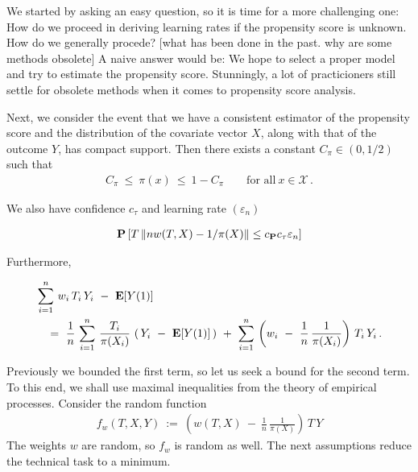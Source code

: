 We started by asking an easy question, so it is time for a more challenging one: How do we proceed in deriving learning rates if the propensity score is unknown.
How do we generally procede?
[what has been done in the past. why are some methods obsolete]
A naive answer would be: We hope to select a proper model and try to estimate the propensity score.
Stunningly, a lot of practicioners still settle for obsolete methods when it comes to propensity score analysis.


Next, we consider the event that we have a consistent estimator of the 
propensity score and the distribution of the covariate vector $X$, 
along with that of the outcome $Y$, 
has compact support.
Then there exists a constant $C_\pi\in (0,1/2)$ such that 
\begin{gather}
  C_\pi \ \le\  \pi(x) \ \le\  1-C_\pi 
  \qquad
  \text{for all}\ 
  x \in \mathcal{X}\,.
\end{gather}

We also have
confidence $c_\tau$ and learning rate $(\varepsilon_n)$

\begin{gather}
  \mathbf{P}
  \left[ 
    T
    \left\lVert
      n w(T,X)
      -
      1/\pi(X)
    \right\rVert
    \le
    c_{\mathbf{P}}
    c_{\tau}
    \varepsilon_n
  \right]
\end{gather}

Furthermore, 

\begin{align}
  \begin{split}
  &\sum_{i=1}^{n}
  \,
  w_i\,T_i\,Y_i
  \ 
  -
  \ 
  \E[Y(1)]
  \\
  &\quad=
    \ 
    \frac{1}{n}
    \,
  \sum_{i=1}^{n}
  \,
    \frac{T_i}{\pi(X_i)}
    \,
  \left(
    \,
    Y_i
    \ 
    -
    \ 
  \E[Y(1)]
  \,
  \right)
  \ +
  \ 
  \sum_{i=1}^{n}
  \,
  \left( 
    w_i
    \ 
    -
    \ 
    \frac{1}{n}\,
    \frac{1}{\pi(X_i)}
  \right)
  \,
  T_i
  \,
  Y_i
  \,.
  \end{split}
\end{align}

Previously we bounded the first term, so let us seek a bound for the second term.
To this end, we shall use maximal inequalities from the theory of empirical processes.
Consider
the random function
\begin{gather}
  f_w(T,X,Y)
  \ 
  :=
  \ 
  \left( 
    w(T,X)
    \ 
    -
    \ 
    \frac{1}{n}\,
    \frac{1}{\pi(X)}
  \right)
  \,
  T
  \,
  Y
\end{gather}
The weights $w$ are random, so $f_w$ is random as well. 
The next assumptions reduce the technical task to a minimum.

